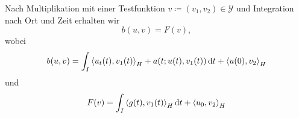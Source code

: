 Nach Multiplikation mit einer Testfunktion $v \coloneqq (v_1, v_2) \in \mathcal{Y}$ und Integration nach Ort und Zeit erhalten wir
\begin{equation}
    \label{eq:bilinearform}
    b(u, v) = F(v),
\end{equation}
wobei
\begin{equation}
    b(u,v) = \int_{I} \left\langle u_{t}(t),v_{1}(t)\right\rangle_{H} + a(t; u(t), v_{1}(t)) \mathop{}\!\mathrm{d} t + \left\langle u(0),v_{2}\right\rangle_{H}
\end{equation}
und
\begin{equation}
    F(v) = \int_{I} \left\langle g(t),v_{1}(t)\right\rangle_{H} \mathop{}\!\mathrm{d} t + \left\langle u_{0},v_{2}\right\rangle_{H}
\end{equation}


